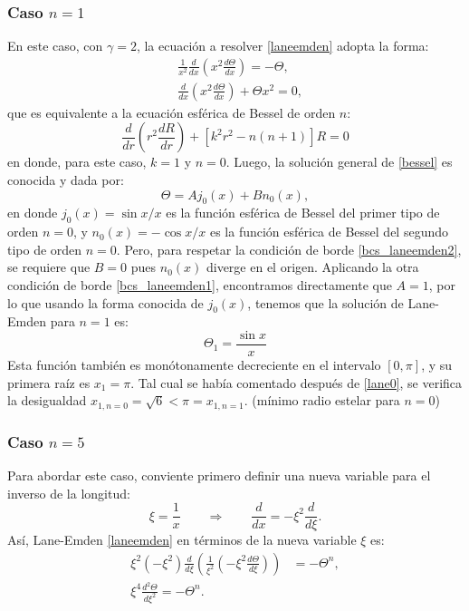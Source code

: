 \subsubsection{Caso \texorpdfstring{$n=1$}{n1}}
En este caso, con $\gamma=2$, la ecuación a resolver \eqref{laneemden} adopta la forma:
\begin{align}
&\frac{1}{x^2}\frac{d}{dx}\left(x^2\frac{d\Theta}{dx}\right)=-\Theta,\\
&\frac{d}{dx}\left(x^2\frac{d\Theta}{dx}\right)+\Theta x^2=0,\label{bessel}
\end{align}
que es equivalente a la ecuación esférica de Bessel de orden $n$:
\begin{equation}
 \frac{d}{dr}\left(r^2\frac{dR}{dr}\right)+\left[k^2 r^2-n(n+1)\right]R=0
\end{equation}
en donde, para este caso, $k=1$ y $n=0$. Luego, la solución general de \eqref{bessel} es conocida y dada por:
\begin{equation}
 \Theta=Aj_0(x)+Bn_0(x),
\end{equation}
en donde $j_0(x)=\sin x/x$ es la función esférica de Bessel del primer tipo de orden $n=0$, y $n_0(x)=-\cos x/x$ es la función esférica de Bessel del segundo tipo de orden $n=0$. Pero, para respetar la condición de borde \eqref{bcs_laneemden2}, se requiere que  $B=0$ pues $n_0(x)$ diverge en el origen. Aplicando la otra condición de borde \eqref{bcs_laneemden1}, encontramos directamente que $A=1$, por lo que usando la forma conocida de $j_0(x)$, tenemos que la solución de Lane-Emden para $n=1$ es:
\begin{equation}\label{lane1}
 \boxed{\Theta_1=\frac{\sin x}{x}}
\end{equation}
Esta función también es monótonamente decreciente en el intervalo $[0,\pi]$, y su primera raíz es $x_1=\pi$. Tal cual se había comentado después de \eqref{lane0}, se verifica la desigualdad $x_{1,n=0}=\sqrt{6}<\pi=x_{1,n=1}.$ (mínimo radio estelar para $n=0$)


\subsubsection{Caso \texorpdfstring{$n=5$}{n5}}\label{sec:exactas-n5}
Para abordar este caso, conviente primero definir una nueva variable para el inverso de la longitud:
\begin{equation}\label{lane5cambio}
 \xi=\frac{1}{x}\qquad\Rightarrow\qquad \frac{d}{d x}=-\xi^2\frac{d}{d\xi}.
\end{equation}
Así, Lane-Emden \eqref{laneemden} en términos de la nueva variable $\xi$ es:
\begin{align}
\xi^2(-\xi^2)\frac{d}{d\xi}\left(\frac{1}{\xi^2}(-\xi^2\frac{d\Theta}{d\xi})\right)&=-\Theta^n, \\
\xi^4\frac{d^2\Theta}{d\xi^2}=-\Theta^n.\label{transkelvin}
\end{align}

